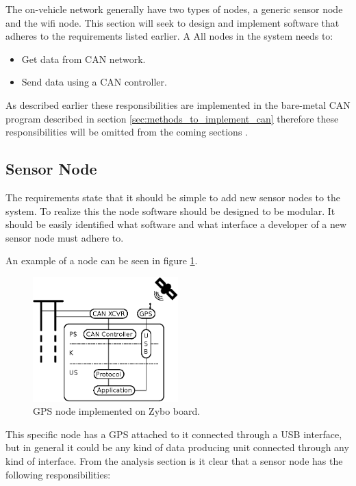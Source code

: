 The on-vehicle network generally have two types of nodes, a generic sensor node and the wifi node.
This section will seek to design and implement software that adheres to the requirements listed earlier.
A
All nodes in the system needs to:
\begin{itemize}
\item Get data from CAN network.
\item Send data using a CAN controller.
\end{itemize}
As described earlier these responsibilities are implemented in the bare-metal CAN program described in section \ref{sec:methods_to_implement_can} therefore these responsibilities will be omitted from the coming sections .

\subsection{Sensor Node}
\label{sec:sensor_node}
The requirements state that it should be simple to add new sensor nodes to the system. 
To realize this the node software should be designed to be modular.
It should be easily identified what software and what interface a developer of a new sensor node must adhere to.

An example of a node can be seen in figure \ref{fig:gps_node}.


\begin{figure}[!h]
\centering
\includegraphics[width=0.5\textwidth]{graphics/analysis_gps.eps}
\caption{GPS node implemented on Zybo board.}
\label{fig:gps_node}
\end{figure}

This specific node has a GPS attached to it connected through a USB interface, but in general it could be any kind of data producing unit connected through any kind of interface.
From the analysis section is it clear that a sensor node has the following responsibilities:

